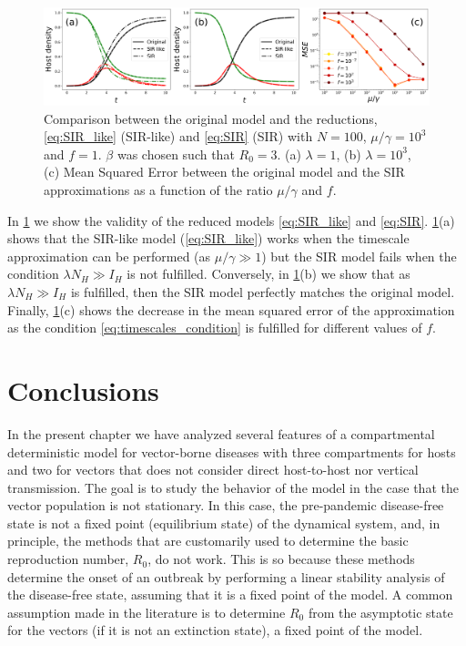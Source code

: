 \begin{figure}[H]
    \centering
    \includegraphics[width=\textwidth]{Figures/SIR_like_approx_comp.pdf}
    \caption[Comparison between the original model and the
    reductions]{Comparison between the original model and the reductions,
    \cref{eq:SIR_like} (SIR-like) and \cref{eq:SIR} (SIR) with $N=100$,
    $\mu/\gamma=10^{3}$ and $f=1$. $\beta$ was chosen such that $R_0=3$.  (a)
    $\lambda=1$, (b) $\lambda=10^3$, (c) Mean Squared Error between the
    original
    model and the SIR approximations as a function of the ratio $\mu/\gamma$
    and
    $f$.}
    \label{fig:SIR_like_approx}
\end{figure}

In \cref{fig:SIR_like_approx} we show the validity of the reduced models
\cref{eq:SIR_like} and \cref{eq:SIR}. \cref{fig:SIR_like_approx}(a) shows that
the SIR-like model (\cref{eq:SIR_like}) works when the timescale approximation
can be performed (as $\mu/\gamma\gg1$) but the SIR model fails when the
condition $\lambda N_H \gg I_H$ is not fulfilled. Conversely, in
\cref{fig:SIR_like_approx}(b) we show that as $\lambda N_H \gg I_H$ is
fulfilled, then the SIR model perfectly matches the original model. Finally,
\cref{fig:SIR_like_approx}(c) shows the decrease in the mean squared error of
the approximation as the condition \cref{eq:timescales_condition} is fulfilled
for different values of $f$.

\section{Conclusions}\label{sec:conclusions}

In the present chapter we have analyzed several features of a compartmental
deterministic model for vector-borne diseases with three compartments for hosts
and two for vectors that does not consider direct host-to-host nor vertical
transmission. The goal is to study the behavior of the model in the
case that the vector population is not stationary. In this case, the
pre-pandemic disease-free state is not a fixed point (equilibrium state) of the
dynamical system, and, in principle, the methods that are customarily used to
determine the basic reproduction number, $R_0$, do not work. This is so because
these methods determine the onset of an outbreak by performing a linear
stability analysis of the disease-free state, assuming that it is a fixed point
of the model. A common assumption made in the literature is to determine $R_0$
from the asymptotic state for the vectors (if it is not an extinction state), a
fixed point of the model.

